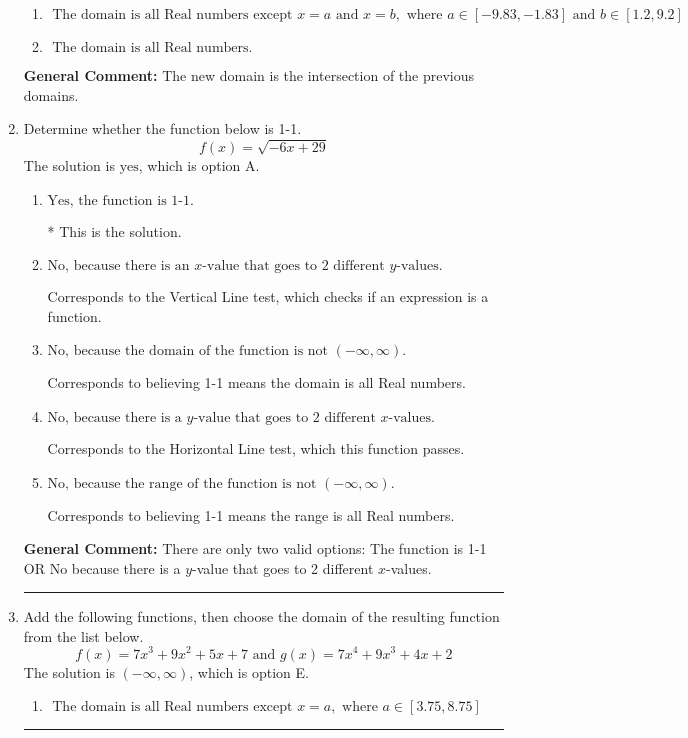 \documentclass{extbook}[14pt]
\newcommand{\litem}[1]{\item #1

\rule{\textwidth}{0.4pt}}
\begin{document}
\begin{enumerate}
{\begin{enumerate}[label=\Alph*.]
\item \( \text{ The domain is all Real numbers except } x = a \text{ and } x = b, \text{ where } a \in [-9.83, -1.83] \text{ and } b \in [1.2, 9.2] \)


\item \( \text{ The domain is all Real numbers. } \)


\end{enumerate}

\textbf{General Comment:} The new domain is the intersection of the previous domains.
}
\litem{
Determine whether the function below is 1-1.
\[ f(x) = \sqrt{-6 x + 29} \]The solution is \( \text{yes} \), which is option A.\begin{enumerate}[label=\Alph*.]
\item \( \text{Yes, the function is 1-1.} \)

* This is the solution.
\item \( \text{No, because there is an $x$-value that goes to 2 different $y$-values.} \)

Corresponds to the Vertical Line test, which checks if an expression is a function.
\item \( \text{No, because the domain of the function is not $(-\infty, \infty)$.} \)

Corresponds to believing 1-1 means the domain is all Real numbers.
\item \( \text{No, because there is a $y$-value that goes to 2 different $x$-values.} \)

Corresponds to the Horizontal Line test, which this function passes.
\item \( \text{No, because the range of the function is not $(-\infty, \infty)$.} \)

Corresponds to believing 1-1 means the range is all Real numbers.
\end{enumerate}

\textbf{General Comment:} There are only two valid options: The function is 1-1 OR No because there is a $y$-value that goes to 2 different $x$-values.
}
\litem{
Add the following functions, then choose the domain of the resulting function from the list below.
\[ f(x) = 7x^{3} +9 x^{2} +5 x + 7 \text{ and } g(x) = 7x^{4} +9 x^{3} +4 x + 2 \]The solution is \( (-\infty, \infty) \), which is option E.\begin{enumerate}[label=\Alph*.]
\item \( \text{ The domain is all Real numbers except } x = a, \text{ where } a \in [3.75, 8.75] \)



\end{enumerate}}
\end{enumerate}
\end{document}
